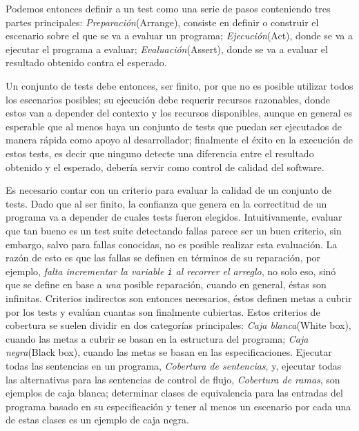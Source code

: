 Podemos entonces definir a un test como una serie de pasos conteniendo tres partes principales: \emph{Preparaci\'on}(Arrange), consiste en definir o construir el escenario sobre el que se va a evaluar un programa; \emph{Ejecuci\'on}(Act), donde se va a ejecutar el programa a evaluar; \emph{Evaluaci\'on}(Assert), donde se va a evaluar el resultado obtenido contra el esperado.

Un conjunto de tests debe entonces, ser finito, por que no es posible utilizar todos los escenarios posibles; su ejecuci\'on debe requerir recursos razonables, donde estos van a depender del contexto y los recursos disponibles, aunque en general es esperable que al menos haya un conjunto de tests que puedan ser ejecutados de manera r\'apida como apoyo al desarrollador; finalmente el \'exito en la execuci\'on de estos tests, es decir que ninguno detecte una diferencia entre el resultado obtenido y el esperado, deber\'ia servir como control de calidad del software.

Es necesario contar con un criterio para evaluar la calidad de un conjunto de tests. Dado que al ser finito, la confianza que genera en la correctitud de un programa va a depender de cuales tests fueron elegidos. Intuitivamente, evaluar que tan bueno es un test suite detectando fallas parece ser un buen criterio, sin embargo, salvo para fallas conocidas, no es posible realizar esta evaluaci\'on. La raz\'on de esto es que las fallas se definen en t\'erminos de su reparaci\'on, por ejemplo, \emph{falta incrementar la variable \texttt{i} al recorrer el arreglo}, no solo eso, sin\'o que se define en base a \emph{una} posible reparaci\'on, cuando en general, \'estas son infinitas. Criterios indirectos son entonces necesarios, \'estos definen metas a cubrir por los tests y eval\'uan cuantas son finalmente cubiertas. Estos criterios de cobertura se suelen dividir en dos categor\'ias principales: \emph{Caja blanca}(White box), cuando las metas a cubrir se basan en la estructura del programa; \emph{Caja negra}(Black box), cuando las metas se basan en las especificaciones. Ejecutar todas las sentencias en un programa, \emph{Cobertura de sentencias}, y, ejecutar todas las alternativas para las sentencias de control de flujo, \emph{Cobertura de ramas}, son ejemplos de caja blanca; determinar clases de equivalencia para las entradas del programa basado en su especificaci\'on y tener al menos un escenario por cada una de estas clases es un ejemplo de caja negra.


